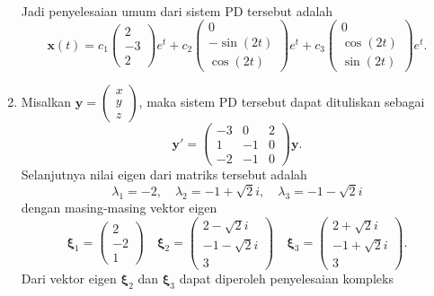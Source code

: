 \documentclass[a4paper]{article}
\theoremstyle{definisi}
\newcommand{\bfxi}{\boldsymbol{\xi}}
\numberwithin{equation}{section}
\begin{document}
\begin{enumerate}
\begin{align*}
    \end{align*}
    Jadi penyelesaian umum dari sistem PD tersebut adalah
    \[\mathbf{x}(t) = c_1\begin{pmatrix}2\\-3\\2\end{pmatrix}e^t + c_2\begin{pmatrix}0\\-\sin(2t)\\ \cos(2t)\end{pmatrix}e^t + c_3\begin{pmatrix}0\\ \cos(2t)\\ \sin(2t)\end{pmatrix}e^t.\]
    
    \item Misalkan $\mathbf{y} = \begin{pmatrix}x\\y\\z\end{pmatrix}$, maka sistem PD tersebut dapat dituliskan sebagai
    \begin{equation*}
      \mathbf{y'}=\begin{pmatrix}
        -3 & 0 & 2\\
        1 & -1 & 0\\
        -2 & -1 & 0
      \end{pmatrix}\mathbf{y}.
    \end{equation*}
    Selanjutnya nilai eigen dari matriks tersebut adalah
    \[\lambda_1 = -2, \quad \lambda_2 = -1+\sqrt{2}i, \quad \lambda_3 = -1-\sqrt{2}i\]
    dengan masing-masing vektor eigen
    \[\bfxi_1 = \begin{pmatrix}2\\-2\\1\end{pmatrix} \quad \bfxi_2 = \begin{pmatrix}2-\sqrt{2}i\\-1-\sqrt{2}i\\3\end{pmatrix} \quad \bfxi_3 = \begin{pmatrix}2+\sqrt{2}i\\-1+\sqrt{2}i\\3\end{pmatrix}.\]
    Dari vektor eigen $\bfxi_2$ dan $\bfxi_3$ dapat diperoleh penyelesaian kompleks
    \begin{align*}

\end{align*}
\end{enumerate}
\end{document}
